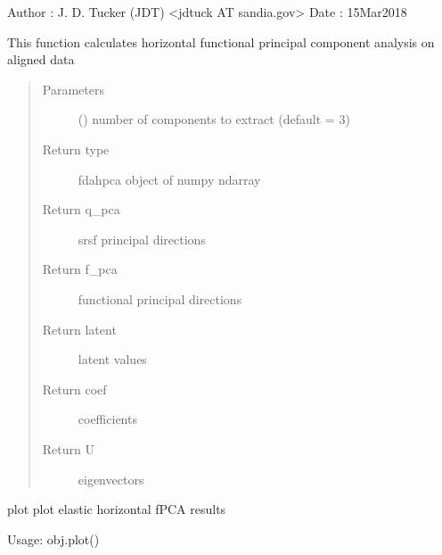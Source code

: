 \documentclass[letterpaper,10pt,english]{sphinxmanual}
\begin{document}
\begin{fulllineitems}
Author :  J. D. Tucker (JDT) \textless{}jdtuck AT sandia.gov\textgreater{}
Date   :  15\sphinxhyphen{}Mar\sphinxhyphen{}2018

\begin{fulllineitems}
\label{\detokenize{fPCA:fPCA.fdahpca.calc_fpca}}
This function calculates horizontal functional principal component analysis on aligned data
\begin{quote}\begin{description}
\item[{Parameters}] \leavevmode
{} () \textendash{} number of components to extract (default = 3)

\item[{Return type}] \leavevmode
fdahpca object of numpy ndarray

\item[{Return q\_pca}] \leavevmode
srsf principal directions

\item[{Return f\_pca}] \leavevmode
functional principal directions

\item[{Return latent}] \leavevmode
latent values

\item[{Return coef}] \leavevmode
coefficients

\item[{Return U}] \leavevmode
eigenvectors

\end{description}\end{quote}

\end{fulllineitems}


\begin{fulllineitems}
\label{\detokenize{fPCA:fPCA.fdahpca.plot}}
plot plot elastic horizontal fPCA results

Usage: obj.plot()

\end{fulllineitems}


\end{fulllineitems}
\end{document}
